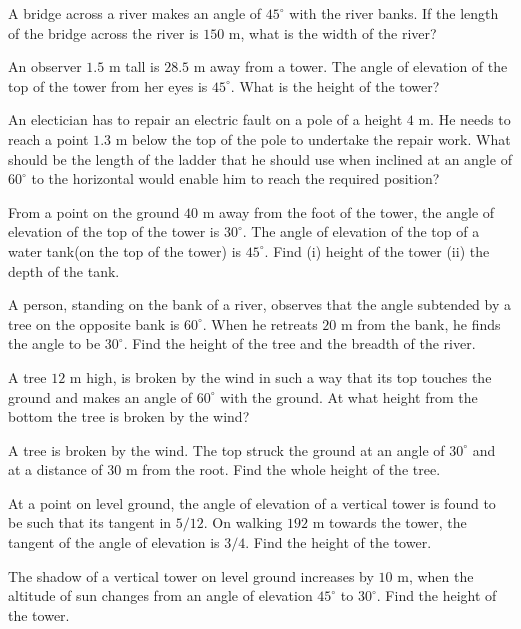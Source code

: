 \item A bridge across a river makes an angle of $45^\circ$ with the river banks. If the length of the bridge across the river is
  $150$ m, what is the width of the river?

\item An observer $1.5$ m tall is $28.5$ m away from a tower. The angle of elevation of the top of the tower from her eyes
  is $45^\circ$. What is the height of the tower?

\item An electician has to repair an electric fault on a pole of a height $4$ m. He needs to reach a point $1.3$ m below
  the top of the pole to undertake the repair work. What should be the length of the ladder that he should use when inclined at an
  angle of $60^\circ$ to the horizontal would enable him to reach the required position?

\item From a point on the ground $40$ m away from the foot of the tower, the angle of elevation of the top of the tower is
  $30^\circ$. The angle of elevation of the top of a water tank(on the top of the tower) is $45^\circ$. Find (i)
  height of the tower (ii) the depth of the tank.

\item A person, standing on the bank of a river, observes that the angle subtended by a tree on the opposite bank is
  $60^\circ$. When he retreats $20$ m from the bank, he finds the angle to be $30^\circ$. Find the height of
  the tree and the breadth of the river.

\item A tree $12$ m high, is broken by the wind in such a way that its top touches the ground and makes an angle of
  $60^\circ$ with the ground. At what height from the bottom the tree is broken by the wind?

\item A tree is broken by the wind. The top struck the ground at an angle of $30^\circ$ and at a distance of $30$ m from
  the root. Find the whole height of the tree.

\item At a point on level ground, the angle of elevation of a vertical tower is found to be such that its tangent in $5/12$. On
  walking $192$ m towards the tower, the tangent of the angle of elevation is $3/4$. Find the height of the tower.

\item The shadow of a vertical tower on level ground increases by $10$ m, when the altitude of sun changes from an angle of
  elevation $45^\circ$ to $30^\circ$. Find the height of the tower.

